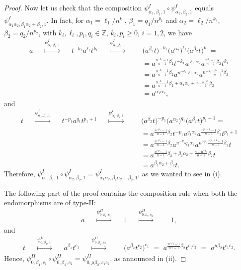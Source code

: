 \documentclass[a4paper]{amsart}
\theoremstyle{definition}
\newcommand\ZZ{\mathbb{Z}}
\begin{document}
\begin{proof}
Now let us check that the composition $\psi^I_{\alpha_1, \beta_1, 1} \circ \psi^I_{\alpha_2, \beta_2, 1}$ equals $\psi^I_{\alpha_1\alpha_2, \beta_1\alpha_2+\beta_2, 1}$. In fact, for $\alpha_1={\ell}_1/n^{k_1}$, $\beta_1=q_1/n^{p_1}$ and $\alpha_2={\ell}_2/n^{k_2}$, $\beta_2=q_2/n^{p_2}$, with $k_i, \ell_i, p_i, q_i\in \ZZ$, $k_i, p_i\geq 0$, $i=1,2$, we have
%
 \begin{align*}
a \stackrel{\psi^I_{\alpha_1, \beta_1, 1}}{\qquad\mapsto\qquad} t^{-k_1} a^{\ell_1} t^{k_1} \stackrel{\psi^I_{\alpha_2, \beta_2, 1}}{\qquad\mapsto\qquad} & \big( a^{\beta_2} t\big)^{-k_1} \big( a^{\alpha_2}\big)^{\ell_1} \big( a^{\beta_2} t\big)^{k_1}= \\ &= a^{\frac{n^{-k_1}-1}{n-1}\beta_2} t^{-k_1} a^{\ell_1\alpha_2} a^{\frac{n^{k_1}-1}{n-1}\beta_2} t^{k_1} \\ &= a^{\frac{n^{-k_1}-1}{n-1}\beta_2} a^{n^{-k_1} \ell_1\alpha_2} a^{n^{-k_1}\frac{n^{k_1}-1}{n-1}\beta_2} \\ &= a^{\frac{n^{-k_1}-1}{n-1}\beta_2+\alpha_1\alpha_2+\frac{1-n^{-k_1}}{n-1}\beta_2} \\ &= a^{\alpha_1\alpha_2},
 \end{align*}
%
and
%
\begin{align*}
t \stackrel{\psi^I_{\alpha_1, \beta_1, 1}}{\qquad\mapsto\qquad} t^{-p_1} a^{q_1} t^{p_1+1} \stackrel{\psi^I_{\alpha_2, \beta_2, 1}}{\qquad\mapsto\qquad} & \big( a^{\beta_2} t\big)^{-p_1} \big( a^{\alpha_2} \big)^{q_1} \big( a^{\beta_2} t\big)^{p_1+1}= \\ &= a^{\frac{n^{-p_1}-1}{n-1}\beta_2} t^{-p_1} a^{q_1\alpha_2} a^{\frac{n^{p_1+1}-1}{n-1}\beta_2} t^{p_1+1} \\ &= a^{\frac{n^{-p_1}-1}{n-1}\beta_2} a^{n^{-p_1}q_1\alpha_2} a^{n^{-p_1}\frac{n^{p_1+1}-1}{n-1}\beta_2} t \\ &= a^{\frac{n^{-p_1}-1}{n-1}\beta_2+\beta_1\alpha_2+\frac{n-n^{-p_1}}{n-1}\beta_2} t 
\\ &= a^{\beta_1\alpha_2+\beta_2} t.
 \end{align*}
%
Therefore, $\psi^I_{\alpha_1,\beta_1, 1} \circ \psi^I_{\alpha_2,\beta_2, 1} =\psi^I_{\alpha_1\alpha_2, \beta_1\alpha_2+\beta_2, 1}$, as we wanted to see in (i).

The following part of the proof contains the composition rule when both the endomorphisms are of type-II:
%
 \begin{align*}
a \stackrel{\psi^{II}_{0, \beta_1, c_1}}{\qquad\mapsto\qquad} 1 \stackrel{\psi^{II}_{0, \beta_2, c_2}}{\qquad\mapsto\qquad} & 1 ,
 \end{align*}
%
and
%
\begin{align*}
t \stackrel{\psi^{II}_{0, \beta_1, c_1}}{\qquad\mapsto\qquad}  a^{\beta_1} t^{c_1} \stackrel{\psi^{II}_{0, \beta_2, c_2}}{\qquad\mapsto\qquad} & \big( a^{\beta_2}t^{c_2}\big)^{c_1} \, \, = \, \,  a^{\frac{n^{c_1c_2}-1}{n^{c_2}-1}\beta_2} t^{c_1 c_2} \, \, = \, \, a^{\mu\beta_2} t^{c_1 c_2}.
 \end{align*}
%
Hence, $\psi^{II}_{0,\beta_1, c_1} \circ \psi^{II}_{0,\beta_2, c_2} =\psi^{II}_{0, \mu\beta_2, c_1c_2}$, as announced in (ii).


\end{proof}
\end{document}
